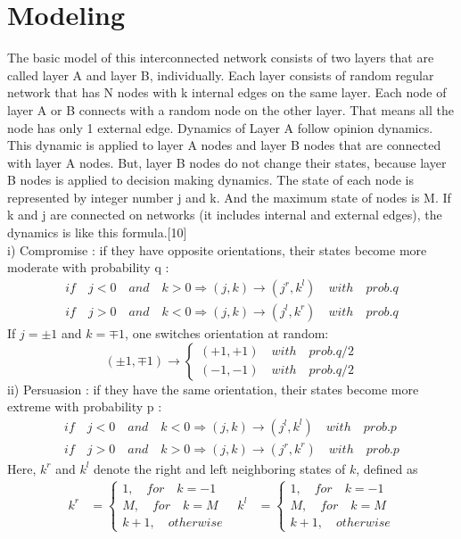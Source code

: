 \documentclass[english]{cccconf}
\begin{document}
\section{Modeling}

The basic model of this interconnected network consists of two layers that are called layer A and layer B, individually. Each layer consists of random regular network that has N nodes with k internal edges on the same layer. Each node of layer A or B connects with a random node on the other layer. That means all the node has only 1 external edge.
Dynamics of Layer A follow opinion dynamics. This dynamic is applied to layer A nodes and layer B nodes that are connected with layer A nodes. But, layer B nodes do not change their states, because layer B nodes is applied to decision making dynamics. The state of each node is represented by integer number j and k. And the maximum state of nodes is M. If k and j are connected on networks (it includes internal and external edges), the dynamics is like this formula.[10] \\
i) Compromise : if they have opposite orientations, their states become more moderate with probability q :
\begin{align*}
  \label{eq1}
  if \quad j<0 \quad and \quad k>0  \Rightarrow (j, k) \rightarrow (j^r, k^l) \quad with\quad prob.q\\
  if \quad j>0 \quad and \quad k<0  \Rightarrow (j, k) \rightarrow (j^l, k^r) \quad with\quad prob.q
\end{align*}
If $j = \pm1$ and $k = \mp1$, one switches orientation at random:
\begin{equation*}
(\pm 1, \mp 1)\rightarrow \left\{\begin{matrix}
(+1, +1) \quad with \quad prob.q/2
\\(-1, -1)\quad with \quad prob.q/2
\end{matrix}\right.
\end{equation*}
ii) Persuasion : if they have the same orientation, their states become more extreme with probability p :
\begin{align*}
 if \quad j<0 \quad and \quad k<0  \Rightarrow (j, k) \rightarrow (j^l, k^l) \quad with\quad prob.p\\
 if \quad j>0 \quad and \quad k>0  \Rightarrow (j, k) \rightarrow (j^r, k^r) \quad with\quad prob.p
\end{align*}
Here, $k^r$ and $k^l$ denote the right and left neighboring states of $k$, defined as
\begin{align}
k^r &= \left\{\begin{matrix}
1,\quad for\quad k= -1
\\ M,\quad for \quad k=M
\\ k+1,\quad otherwise
\end{matrix}\right. &
k^l &= \left\{\begin{matrix}
1,\quad for\quad k= -1
\\ M,\quad for \quad k=M
\\ k+1,\quad otherwise
\end{matrix}\right.
\end{align}
\end{document}
